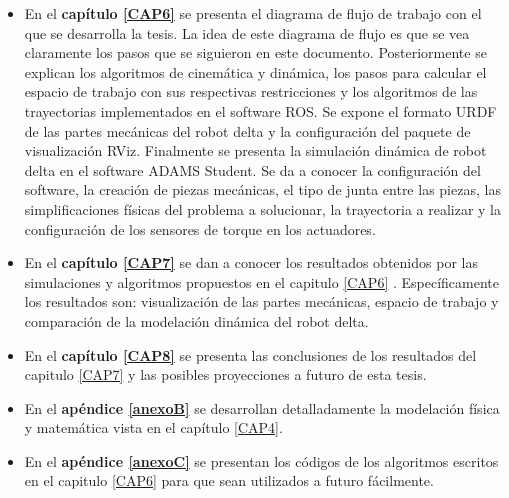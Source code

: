 \begin{itemize}
    \item {En el \textbf{capítulo \eqref{CAP6}} se presenta el diagrama de flujo de trabajo con el que se desarrolla la tesis. La idea de este diagrama de flujo es que se vea claramente los pasos que se siguieron en este documento. Posteriormente se explican los algoritmos de cinemática y dinámica, los pasos para calcular el espacio de trabajo con sus respectivas restricciones y los algoritmos de las trayectorias implementados en el software ROS. Se expone el formato URDF de las partes mecánicas del robot delta y la configuración del paquete de visualización RViz. Finalmente se presenta la simulación dinámica de robot delta en el software ADAMS Student. Se da a conocer la configuración del software, la creación de piezas mecánicas, el tipo de junta entre las piezas, las simplificaciones físicas del problema a solucionar, la trayectoria a realizar y la configuración de los sensores de torque en los actuadores.}
    \item {En el \textbf{capítulo \eqref{CAP7}} se dan a conocer los resultados obtenidos por las simulaciones y algoritmos propuestos en el capitulo \eqref{CAP6} . Específicamente los resultados son: visualización de las partes mecánicas, espacio de trabajo y comparación de la modelación dinámica del robot delta.}
    \item {En el \textbf{capítulo \eqref{CAP8}} se presenta las conclusiones de los resultados del capitulo \eqref{CAP7} y las posibles proyecciones a futuro de esta tesis.}
    \item {En el \textbf{apéndice \eqref{anexoB}} se desarrollan detalladamente la modelación física y matemática vista en el capítulo \eqref{CAP4}.} 
    \item {En el \textbf{apéndice \eqref{anexoC}} se presentan los códigos de los algoritmos escritos en el capitulo \eqref{CAP6} para que sean utilizados a futuro fácilmente.} 
    \end{itemize}